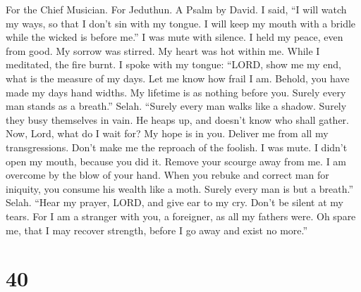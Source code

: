 For the Chief Musician. For Jeduthun. A Psalm by David.  I
said, ``I will watch my ways, so that I don't sin with my tongue. I will
keep my mouth with a bridle while the wicked is before me.''
 I was mute with silence. I held my peace, even from good.
My sorrow was stirred.  My heart was hot within me. While
I meditated, the fire burnt. I spoke with my tongue: 
``LORD, show me my end, what is the measure of my days. Let me know how
frail I am.  Behold, you have made my days hand widths. My
lifetime is as nothing before you. Surely every man stands as a
breath.'' Selah.  ``Surely every man walks like a shadow.
Surely they busy themselves in vain. He heaps up, and doesn't know who
shall gather.  Now, Lord, what do I wait for? My hope is
in you.  Deliver me from all my transgressions. Don't make
me the reproach of the foolish.  I was mute. I didn't open
my mouth, because you did it.  Remove your scourge away
from me. I am overcome by the blow of your hand.  When
you rebuke and correct man for iniquity, you consume his wealth like a
moth. Surely every man is but a breath.'' Selah.  ``Hear
my prayer, LORD, and give ear to my cry. Don't be silent at my tears.
For I am a stranger with you, a foreigner, as all my fathers were.
 Oh spare me, that I may recover strength, before I go
away and exist no more.''

\hypertarget{section-39}{%
\section{40}\label{section-39}}


